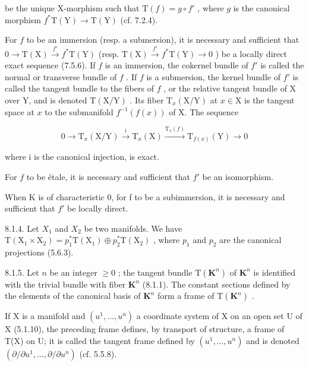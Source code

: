 be the unique X-morphism such that \(\mathrm{T}(f) = g \circ f'\) , where \(g\) is the canonical morphism \(f^{*}\mathrm{T}(\mathrm{Y}) \to \mathrm{T}(\mathrm{Y})\) (cf. 7.2.4).

For \(f\) to be an immersion (resp. a submersion), it is necessary and sufficient that \(0 \to \mathrm{T}(\mathrm{X}) \xrightarrow{f'} f^* \mathrm{T}(\mathrm{Y})\) (resp. \(\mathrm{T}(\mathrm{X}) \xrightarrow{f'} f^* \mathrm{T}(\mathrm{Y}) \to 0\) ) be a locally direct exact sequence (7.5.6). If \(f\) is an immersion, the cokernel bundle of \(f'\) is called the normal or transverse bundle of \(f\) . If \(f\) is a submersion, the kernel bundle of \(f'\) is called the tangent bundle to the fibers of \(f\) , or the relative tangent bundle of X over Y, and is denoted \(\mathrm{T}(\mathrm{X}/\mathrm{Y})\) . Its fiber \(\mathrm{T}_x(\mathrm{X}/\mathrm{Y})\) at \(x \in \mathrm{X}\) is the tangent space at \(x\) to the submanifold \(f^{-1}(f(x))\) of X. The sequence

\[
0 \longrightarrow \mathrm{T} _ {x} (\mathrm{X} / \mathrm{Y}) \stackrel {i} {\longrightarrow} \mathrm{T} _ {x} (\mathrm{X}) \stackrel {\mathrm{T} _ {x} (f)} {\longrightarrow} \mathrm{T} _ {f (x)} (\mathrm{Y}) \longrightarrow 0
\]

where i is the canonical injection, is exact.

For \(f\) to be étale, it is necessary and sufficient that \(f'\) be an isomorphism.

When K is of characteristic 0, for f to be a subimmersion, it is necessary and sufficient that \(f'\) be locally direct.

8.1.4. Let \(X_{1}\) and \(X_{2}\) be two manifolds. We have \(\mathrm{T}(\mathrm{X}_{1} \times \mathrm{X}_{2}) = p_{1}^{*}\mathrm{T}(\mathrm{X}_{1}) \oplus p_{2}^{*}\mathrm{T}(\mathrm{X}_{2})\) , where \(p_{1}\) and \(p_{2}\) are the canonical projections (5.6.3).

8.1.5. Let \(n\) be an integer \(\geqslant 0\) ; the tangent bundle \(\mathrm{T}(\mathbf{K}^{n})\) of \(\mathbf{K}^{n}\) is identified with the trivial bundle with fiber \(\mathbf{K}^{n}\) (8.1.1). The constant sections defined by the elements of the canonical basis of \(\mathbf{K}^{n}\) form a frame of \(\mathrm{T}(\mathbf{K}^{n})\) .

If X is a manifold and \((u^{1},\ldots,u^{n})\) a coordinate system of X on an open set U of X (5.1.10), the preceding frame defines, by transport of structure, a frame of T(X) on U; it is called the tangent frame defined by \((u^{1},\ldots,u^{n})\) and is denoted \((\partial/\partial u^{1},\ldots,\partial/\partial u^{n})\) (cf. 5.5.8).

